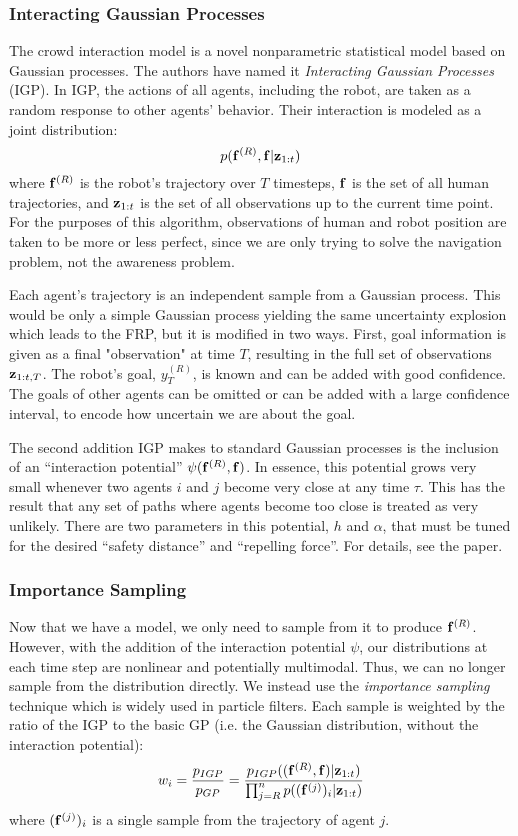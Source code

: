 \documentclass[a4paper,11pt,headings=small]{article}
\begin{document}
\subsubsection*{Interacting Gaussian Processes}
The crowd interaction model is a novel nonparametric statistical model based on Gaussian processes. The authors have named it \emph{Interacting Gaussian Processes} (IGP). In IGP, the actions of all agents, including the robot, are taken as a random response to other agents' behavior. Their interaction is modeled as a joint distribution:
$$p(\mathbf{f}^{(R)},\mathbf{f}|\mathbf{z}_{1:t})$$
where $\mathbf{f}^{(R)}$ is the robot's trajectory over $T$ timesteps, $\mathbf{f}$ is the set of all human trajectories, and $\mathbf{z}_{1:t}$ is the set of all observations up to the current time point. For the purposes of this algorithm, observations of human and robot position are taken to be more or less perfect, since we are only trying to solve the navigation problem, not the awareness problem.

Each agent's trajectory is an independent sample from a Gaussian process. This would be only a simple Gaussian process yielding the same uncertainty explosion which leads to the FRP, but it is modified in two ways. First, goal information is given as a final "observation" at time $T$, resulting in the full set of observations $\mathbf{z}_{1:t,T}$. The robot's goal, $y_T^{(R)}$, is known and can be added with good confidence. The goals of other agents can be omitted or can be added with a large confidence interval, to encode how uncertain we are about the goal.

The second addition IGP makes to standard Gaussian processes is the inclusion of an ``interaction potential'' $\psi(\mathbf{f}^{(R)},\mathbf{f})$. In essence, this potential grows very small whenever two agents $i$ and $j$ become very close at any time $\tau$. This has the result that any set of paths where agents become too close is treated as very unlikely. There are two parameters in this potential, $h$ and $\alpha$, that must be tuned for the desired ``safety distance'' and ``repelling force''. For details, see the paper.

\subsubsection*{Importance Sampling}
Now that we have a model, we only need to sample from it to produce $\mathbf{f}^{(R)}$. However, with the addition of the interaction potential $\psi$, our distributions at each time step are nonlinear and potentially multimodal. Thus, we can no longer sample from the distribution directly. We instead use the \emph{importance sampling} technique which is widely used in particle filters. Each sample is weighted by the ratio of the IGP to the basic GP (i.e. the Gaussian distribution, without the interaction potential):
$$ w_i = \frac{p_{IGP}}{p_{GP}} = \frac{p_{IGP}((\mathbf{f}^{(R)},\mathbf{f}) | \mathbf{z}_{1:t})}{\prod_{j=R}^n p((\mathbf{f}^{(j)})_i | \mathbf{z}_{1:t})} $$
where $(\mathbf{f}^{(j)})_i$ is a single sample from the trajectory of agent $j$.
\end{document}
